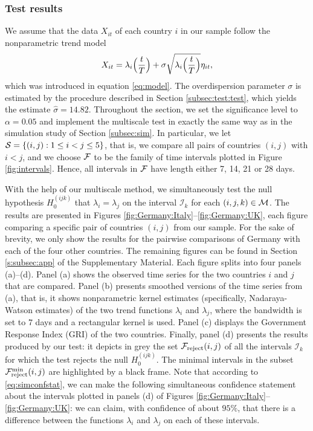 \documentclass[a4paper,12pt]{article}
\numberwithin{equation}{section}
\begin{document}
\subsubsection{Test results}


We assume that the data $X_{it}$ of each country $i$ in our sample follow the nonparametric trend model 
\[ X_{it} = \lambda_i\Big(\frac{t}{T}\Big) + \sigma \sqrt{\lambda_i\Big(\frac{t}{T}\Big)} \eta_{it}, \]
which was introduced in equation \eqref{eq:model}. The overdispersion parameter $\sigma$ is estimated by the procedure described in Section \ref{subsec:test:test}, which yields the estimate {\color{red}$\hat{\sigma} = 14.82$}. Throughout the section, we set the significance level to $\alpha=0.05$ and implement the multiscale test in exactly the same way as in the simulation study of Section \ref{subsec:sim}. In particular, we let $\mathcal{S} = \{ (i,j): 1 \le i < j \le 5\}$, that is, we compare all pairs of countries $(i,j)$ with $i < j$, and we choose $\mathcal{F}$ to be the family of time intervals plotted in Figure \ref{fig:intervals}. Hence, all intervals in $\mathcal{F}$ have length either 7, 14, 21 or 28 days. 


With the help of our multiscale method, we simultaneously test the null hypo\-thesis $H_0^{(ijk)}$ that $\lambda_i = \lambda_j$ on the interval $\mathcal{I}_k$ for each $(i, j, k) \in \mathcal{M}$. The results are presented in Figures \ref{fig:Germany:Italy}--\ref{fig:Germany:UK}, each figure comparing a specific pair of countries $(i,j)$ from our sample. For the sake of brevity, we only show the results for the pairwise comparisons of Germany with each of the four other countries. The remaining figures can be found in Section \ref{s:subsec:app} of the Supplementary Material. Each figure splits into four panels (a)--(d).  Panel (a) shows the observed time series for the two countries $i$ and $j$ that are compared. Panel (b) presents smoothed versions of the time series from (a), that is, it shows nonparametric kernel estimates (specifically, Nadaraya-Watson estimates) of the two trend functions $\lambda_i$ and $\lambda_j$, where the bandwidth is set to $7$ days and a rectangular kernel is used. Panel (c) displays the Government Response Index (GRI) of the two countries. Finally, panel (d) presents the results produced by our test: it depicts in grey the set $\mathcal{F}_{\text{reject}}(i,j)$ of all the intervals $\mathcal{I}_k$ for which the test rejects the null $H_0^{(ijk)}$. The minimal intervals in the subset $\mathcal{F}_{\text{reject}}^{\text{min}}(i, j)$ are highlighted by a black frame. Note that according to \eqref{eq:simconfstat}, we can make the following simultaneous confidence statement about the intervals plotted in panels (d) of Figures \ref{fig:Germany:Italy}--\ref{fig:Germany:UK}: we can claim, with confidence of about $95\%$, that there is a difference between the functions $\lambda_i$ and $\lambda_j$ on each of these intervals.
\end{document}
